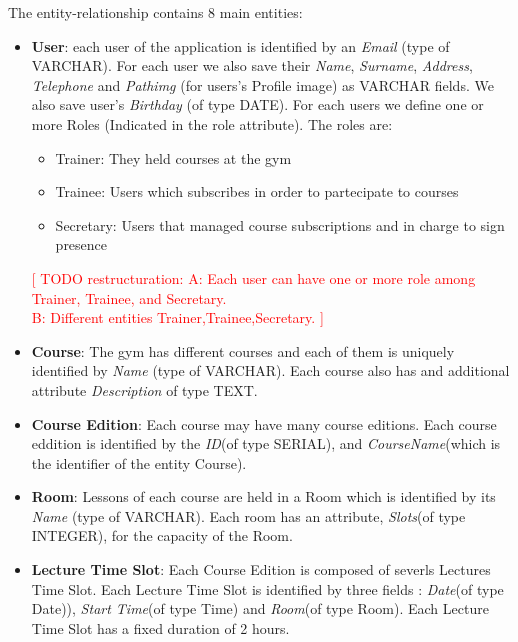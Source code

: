     The entity-relationship contains 8 main entities:
    \begin{itemize}
        \item 
        \textbf{User}: each user of the application is identified by an \textit{Email} (type of VARCHAR). 
    	For each user we also save their \textit{Name}, \textit{Surname}, \textit{Address}, \textit{Telephone} and \textit{Path\textunderscore img} (for users's Profile image) as VARCHAR fields. We also save user's \textit{Birthday} (of type DATE). For each users we define
        one or more Roles (Indicated in the role attribute). The roles are:
        \begin{itemize}
	    \item Trainer: They held courses at the gym 
    	\item Trainee: Users which subscribes in order to partecipate to courses
        \item Secretary: Users that managed course subscriptions and in charge to sign presence
        
        \end{itemize}
    	\textcolor{red}{[ TODO restructuration: A: Each user can have one or more role among Trainer,  Trainee, and Secretary.\\
    	  B: Different entities Trainer,Trainee,Secretary. ]}
    	
    	\item 
    	\textbf{Course}: The gym has different courses and each of them is uniquely identified by 
    	\textit{Name} (type of VARCHAR). Each course also has and additional attribute \textit{Description} of type TEXT.
    	
    	\item 
    	\textbf{Course Edition}: Each course may have many course editions. Each course eddition is identified by the \textit{ID}(of type SERIAL), and \textit{CourseName}(which is the identifier of the entity Course).
    	
    	\item 
    	\textbf{Room}: Lessons of each course are held in a Room which is identified by its \textit{Name} (type of VARCHAR). Each room has an attribute, \textit{Slots}(of type INTEGER), for the capacity of the Room.
    	
    	\item \textbf{Lecture Time Slot}: Each Course Edition is composed of severls Lectures Time Slot. Each Lecture Time Slot is identified by three fields : \textit{Date}(of type Date)), \textit{Start Time}(of type Time) and \textit{Room}(of type Room). Each Lecture Time Slot has a fixed duration of 2 hours.
    	

\end{itemize}
